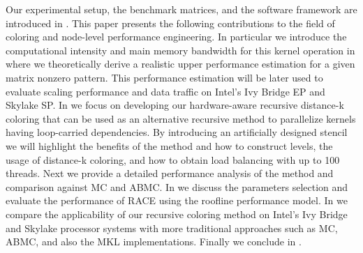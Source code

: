 Our experimental setup, the benchmark matrices, and the software framework are introduced in .
This paper presents the following contributions to the field of coloring and node-level performance engineering. In particular we introduce the computational intensity and main memory bandwidth for this kernel operation in  where we theoretically derive a realistic upper performance estimation for a given matrix nonzero pattern.  This performance estimation will be later used to evaluate scaling performance and data traffic on Intel's Ivy Bridge EP and Skylake SP. In  we focus on developing our hardware-aware recursive distance-k coloring that can be used as an alternative recursive method to parallelize kernels having loop-carried dependencies. By introducing an artificially designed stencil we will highlight the benefits of the method and how to construct levels, the usage of distance-k coloring, and how to obtain load balancing with up to 100 threads. Next we provide a detailed performance analysis of the method and comparison against \acrshort{MC} and \acrshort{ABMC}. In  we discuss the parameters selection and evaluate the performance of \acrshort{RACE} using the roofline performance model. In  we compare the applicability of our recursive coloring method on Intel's Ivy Bridge and Skylake processor systems with more traditional approaches such as  \acrshort{MC}, \acrshort{ABMC}, and also the \acrshort{MKL} implementations. Finally we conclude in 
.


	
\begin{comment}
 \acrshort{RACE}  has two main usage scenarios: It can either return all relevant data structures and parallelization information required for manual implementation of the kernel at hand, or one can just use its callback function interface, which takes care of parallelization and all data handling automatically. As of now \acrshort{RACE} is limited to shared memory nodes as it only supports thread-level parallelism.\acrshort{RACE} uses the \acrfull{CRS} sparse matrix data format but can be easily extended to other formats.
\end{comment}


